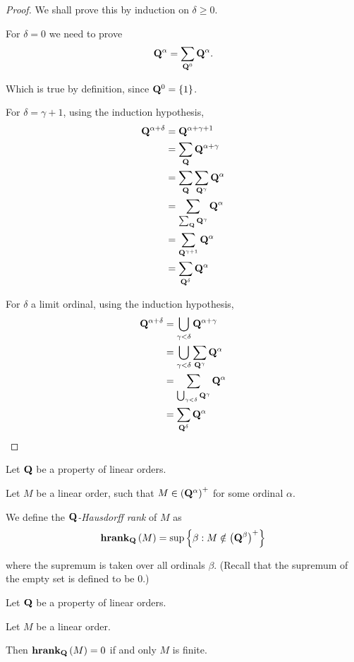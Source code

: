 \begin{proof}
  We shall prove this by induction on $\delta \ge 0$.

  For $\delta = 0$ we need to prove
  \[
    \mathbf{Q}^{\alpha} = \sum_{\mathbf{Q}^0}{\mathbf{Q}^{\alpha}}.
  \]

  Which is true by definition, since $\mathbf{Q}^0 = \left\{ {1} \right\}$.

  For $\delta = \gamma + 1$, using the induction hypothesis,
  \[
    \begin{aligned}
      \mathbf{Q}^{\alpha + \delta}
       & = \mathbf{Q}^{\alpha + \gamma + 1}                     \\
       & = \sum_{\mathbf{Q}}{\mathbf{Q}^{\alpha + \gamma}}             \\
       & = \sum_{\mathbf{Q}}{\sum_{\mathbf{Q}^{\gamma}}{\mathbf{Q}^{\alpha}}} \\
       & = \sum_{\sum_{\mathbf{Q}}{\mathbf{Q}^{\gamma}}}{\mathbf{Q}^{\alpha}} \\
       & = \sum_{\mathbf{Q}^{\gamma + 1}}{\mathbf{Q}^{\alpha}}         \\
       & = \sum_{\mathbf{Q}^{\delta}}{\mathbf{Q}^{\alpha}}
    \end{aligned}
  \]

  For $\delta$ a limit ordinal, using the induction hypothesis,
  \[
    \begin{aligned}
      \mathbf{Q}^{\alpha + \delta}
       & = \bigcup_{\gamma < \delta}{\mathbf{Q}^{\alpha + \gamma}}             \\
       & = \bigcup_{\gamma < \delta}{\sum_{\mathbf{Q}^{\gamma}}{\mathbf{Q}^{\alpha}}} \\
       & = \sum_{\bigcup_{\gamma < \delta}{\mathbf{Q}^{\gamma}}}{\mathbf{Q}^{\alpha}} \\
       & = \sum_{\mathbf{Q}^{\delta}}{\mathbf{Q}^{\alpha}}
    \end{aligned}
  \]

\end{proof}

\begin{definition}
  Let $\mathbf{Q}$ be a property of linear orders.

  Let $M$ be a linear order, such that
  $M \in \left( {\mathbf{Q}^{\alpha}} \right)^+$ for some ordinal $\alpha$.
  
  We define the \emph{$\mathbf{Q}$-Hausdorff rank} of $M$ as
  \[
    \mathbf{hrank}_{\mathbf{Q}} \left( {M} \right) = \sup \left\{ {\beta : M \notin \left( {\mathbf{Q}^{\beta}} \right)^{+}} \right\}
  \]
  
  where the supremum is taken over all ordinals $\beta$.
  (Recall that the supremum of the empty set is defined to be $0$.)

\end{definition}

\begin{example}
  Let $\mathbf{Q}$ be a property of linear orders.

  Let $M$ be a linear order.

  Then $\mathbf{hrank}_{\mathbf{Q}} \left( {M} \right) = 0$ if and only $M$ is finite.
\end{example}
